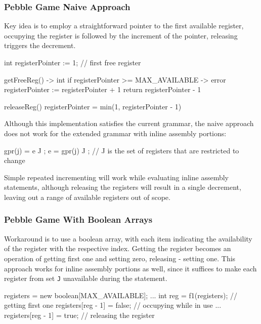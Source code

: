 \subsubsection{Pebble Game Naive Approach}
Key idea is to employ a straightforward pointer to the first available register, occupying the register is followed by the increment of the pointer,
releasing triggers the decrement.
\begin{codeblock}
int registerPointer := 1; // first free register

getFreeReg() -> int {
    if registerPointer >= MAX_AVAILABLE -> { error }
    registerPointer := registerPointer + 1
    return registerPointer - 1
}

releaseReg() {
    registerPointer = min(1, registerPointer - 1)
}
\end{codeblock}
Although this implementation satisfies the current grammar, the naive approach does not work for the extended grammar
with inline assembly portions:
\begin{codeblock}
gpr(j) = e { J };
e = gpr(j) { J };
// J is the set of registers that are restricted to change
\end{codeblock}
Simple repeated incrementing will work while evaluating inline assembly statements, although releasing the
registers will result in a single decrement, leaving out a range of available registers out of scope.

\subsubsection{Pebble Game With Boolean Arrays}
Workaround is to use a boolean array, with each item indicating the availability of the register
with the respective index. Getting the register becomes an operation of getting first one and setting zero,
releasing - setting one. This approach works for inline assembly portions as well, since it suffices to make
each register from set \verb+J+ unavailable during the statement.
\begin{codeblock}
registers = new boolean[MAX_AVAILABLE];
...
int reg = f1(registers); // getting first one
registers[reg - 1] = false; // occupying while in use
...
registers[reg - 1] = true; // releasing the register
\end{codeblock}

